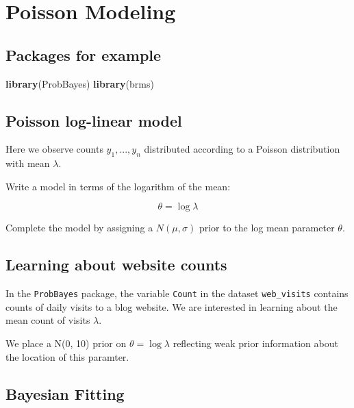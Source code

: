 \documentclass[
]{book}
\newenvironment{Shaded}{\begin{snugshade}}{\end{snugshade}}
\newcommand{\KeywordTok}[1]{\textcolor[rgb]{0.13,0.29,0.53}{\textbf{#1}}}
\newcommand{\NormalTok}[1]{#1}
\begin{document}
\hypertarget{poisson-modeling}{%
\chapter{Poisson Modeling}\label{poisson-modeling}}

\hypertarget{packages-for-example}{%
\section{Packages for example}\label{packages-for-example}}

\begin{Shaded}
\begin{Highlighting}[]
\KeywordTok{library}\NormalTok{(ProbBayes)}
\KeywordTok{library}\NormalTok{(brms)}
\end{Highlighting}
\end{Shaded}

\hypertarget{poisson-log-linear-model}{%
\section{Poisson log-linear model}\label{poisson-log-linear-model}}

Here we observe counts \(y_1, ..., y_n\) distributed according to a Poisson distribution with mean \(\lambda\).

Write a model in terms of the logarithm of the mean:

\[
\theta = \log \lambda
\]

Complete the model by assigning a \(N(\mu, \sigma)\) prior to the log mean parameter \(\theta\).

\hypertarget{learning-about-website-counts}{%
\section{Learning about website counts}\label{learning-about-website-counts}}

In the \texttt{ProbBayes} package, the variable \texttt{Count} in the dataset \texttt{web\_visits} contains counts of daily visits to a blog website. We are interested in learning about the mean count of visits \(\lambda\).

We place a N(0, 10) prior on \(\theta = \log \lambda\) reflecting weak prior information about the location of this paramter.

\hypertarget{bayesian-fitting}{%
\section{Bayesian Fitting}\label{bayesian-fitting}}
\end{document}
